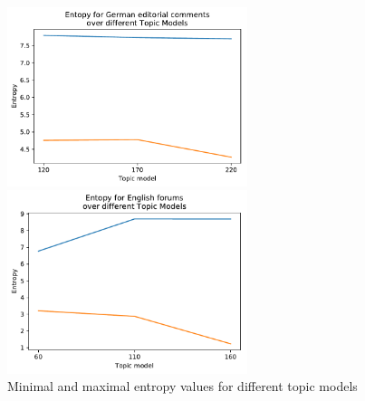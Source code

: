 \begin{figure}[t]
\begin{minipage}{0.5\textwidth}
	\end{minipage}
	\begin{minipage}{0.5\textwidth}
		\centering
		\includegraphics[width=7cm]{gfx/Eval_IC/German_comments_Entropy.pdf}
	\end{minipage}%
	\centering
	\begin{minipage}{0.5\textwidth}
		\includegraphics[width=7cm]{gfx/Eval_IC/English_forums_Entropy.pdf}
	\end{minipage}
	\caption[]{Minimal and maximal entropy values for different topic models}
\end{figure}



